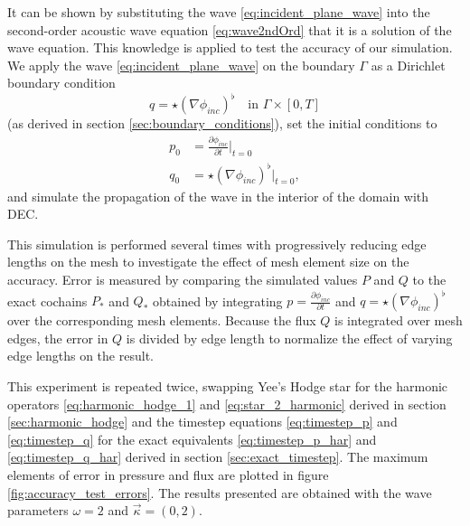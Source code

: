 \documentclass[utf8,english]{gradu3}
\begin{document}
It can be shown by substituting the wave \eqref{eq:incident_plane_wave} into 
the second-order acoustic wave equation \eqref{eq:wave2ndOrd}
that it is a solution of the wave equation.
This knowledge is applied to test the accuracy of our simulation.
We apply the wave \eqref{eq:incident_plane_wave}
on the boundary $\Gamma$ as a Dirichlet boundary condition
\begin{equation}\label{eq:plane_wave_boundary_dirichlet}
  q = \star (\nabla \phi_{inc})^{\flat} \quad \text{in } \Gamma \times [0,T]
\end{equation}
(as derived in section \ref{sec:boundary_conditions}),
set the initial conditions to
\begin{align}
  p_0 &= \frac{\partial \phi_{inc}}{\partial t} \Big|_{t=0} \\
  q_0 &= \star (\nabla \phi_{inc})^{\flat} \Big|_{t=0},
\end{align}
and simulate the propagation of the wave in the interior of the domain with DEC.

This simulation is performed several times with progressively reducing
edge lengths on the mesh to investigate the effect of mesh element size on the accuracy.
Error is measured by comparing the simulated values $P$ and $Q$ to the exact cochains
$P_*$ and $Q_*$ obtained by integrating $p = \frac{\partial \phi_{inc}}{\partial t}$
and $q = \star (\nabla \phi_{inc})^{\flat}$ over the corresponding mesh elements.
Because the flux $Q$ is integrated over mesh edges, the error in $Q$ is divided
by edge length to normalize the effect of varying edge lengths on the result.

This experiment is repeated twice, swapping Yee's Hodge star
for the harmonic operators \eqref{eq:harmonic_hodge_1} and \eqref{eq:star_2_harmonic}
derived in section \ref{sec:harmonic_hodge}
and the timestep equations \eqref{eq:timestep_p} and \eqref{eq:timestep_q}
for the exact equivalents \eqref{eq:timestep_p_har} and \eqref{eq:timestep_q_har}
derived in section \ref{sec:exact_timestep}.
The maximum elements of error in pressure and flux
are plotted in figure \ref{fig:accuracy_test_errors}.
The results presented are obtained with the wave parameters
$\omega = 2$ and $\vec{\kappa} = (0,2)$.
\end{document}
